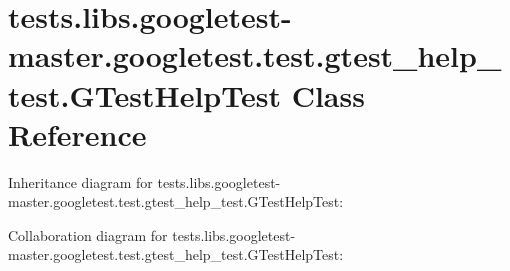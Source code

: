 \hypertarget{classtests_1_1libs_1_1googletest-master_1_1googletest_1_1test_1_1gtest__help__test_1_1GTestHelpTest}{}\section{tests.\+libs.\+googletest-\/master.googletest.\+test.\+gtest\+\_\+help\+\_\+test.\+G\+Test\+Help\+Test Class Reference}
\label{classtests_1_1libs_1_1googletest-master_1_1googletest_1_1test_1_1gtest__help__test_1_1GTestHelpTest}


Inheritance diagram for tests.\+libs.\+googletest-\/master.googletest.\+test.\+gtest\+\_\+help\+\_\+test.\+G\+Test\+Help\+Test\+:


Collaboration diagram for tests.\+libs.\+googletest-\/master.googletest.\+test.\+gtest\+\_\+help\+\_\+test.\+G\+Test\+Help\+Test\+:
